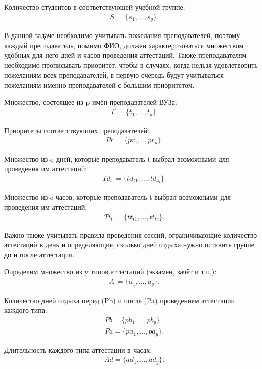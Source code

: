 Количество студентов в соответствующей учебной группе: 
\begin{align}
	& S\ =  \{ s_1,...,s_g \}.
\end{align}

В данной задаче необходимо учитывать пожелания преподавателей, поэтому каждый преподаватель, помимо ФИО, должен характеризоваться множеством удобных для него дней и часов проведения аттестаций. Также преподавателям необходимо прописывать приоритет, чтобы в случаях, когда нельзя удовлетворить пожеланиям всех преподавателей, в первую очередь будут учитываться пожеланиям именно преподавателей с большим приоритетом.

Множество, состоящее из p имён преподавателей ВУЗа:
\begin{align}
	& T\ =  \{t_1,...,t_p \}.
\end{align}

Приоритеты соответствующих преподавателей:
\begin{align}
	& Pr\ =  \{pr_1,..,pr_p \}. 
\end{align}

Множество из q дней, которые преподаватель t выбрал возможными для проведения им аттестаций:
\begin{align}
	& Td_t\ =  \{td_{t1},...,td_{tq} \}. 
\end{align}

Множество из c часов, которые преподаватель t выбрал возможными для проведения им аттестаций:
\begin{align}
	& Tt_t\ =  \{tt_{t1},...,tt_{tc} \}. 
\end{align}

Важно также учитывать правила проведения сессий, ограничивающие количество аттестаций в день и определяющие, сколько дней отдыха нужно оставить группе до и после аттестации.

Определим множество из y типов аттестаций (экзамен, зачёт и т.п.):
\begin{align}
	& A\ =  \{a_1,...,a_y\}. 
\end{align}

Количество дней отдыха перед (Pb)  и после (Pa) проведением аттестации каждого типа:
\begin{align}
	& Pb =  \{pb_1,...,pb_y\}\\ 
	& Pa =  \{pa_1,...,pa_y\}. 
\end{align}

Длительность каждого типа аттестации в часах:
\begin{align}
	& Ad =  \{ad_1,...,ad_y\}.
\end{align}

